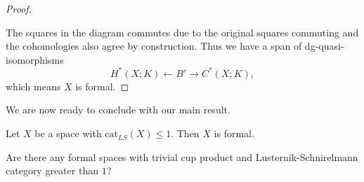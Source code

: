 \begin{proof}
\begin{center}
        \end{center}

    The squares in the diagram commutes due to the original squares commuting
    and the cohomologies also agree by construction. Thus we have a span of 
    dg-quasi-isomorphisms $$H^\ast(X;K)\longleftarrow B'\longrightarrow C^\ast(X;K),$$ 
    which means $X$ is formal. 
\end{proof}

We are now ready to conclude with our main result.
\begin{theorem}
    Let $X$ be a space with $\text{cat}_{LS}(X)\leq 1$. Then $X$ is formal.     
\end{theorem}

\begin{question}
    Are there any formal spaces with trivial cup product and Lusternik-Schnirelmann 
    category greater than $1$? 
\end{question}